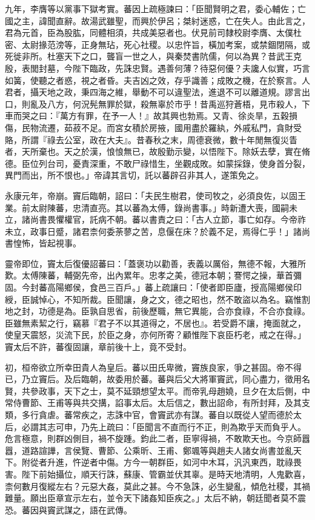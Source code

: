 \begin{pinyinscope}
九年，李膺等以黨事下獄考實。蕃因上疏極諫曰：「臣聞賢明之君，委心輔佐；亡國之主，諱聞直辭。故湯武雖聖，而興於伊呂；桀紂迷惑，亡在失人。由此言之，君為元首，臣為股肱，同體相須，共成美惡者也。伏見前司隸校尉李膺、太僕杜密、太尉掾范滂等，正身無玷，死心社稷。以忠忤旨，橫加考案，或禁錮閉隔，或死徙非所。杜塞天下之口，聾盲一世之人，與秦焚書阬儒，何以為異？昔武王克殷，表閭封墓，今陛下臨政，先誅忠賢。遇善何薄？待惡何優？夫讒人似實，巧言如簧，使聽之者惑，視之者昏。夫吉凶之效，存乎識善；成敗之機，在於察言。人君者，攝天地之政，秉四海之維，舉動不可以違聖法，進退不可以離道規。謬言出口，則亂及八方，何況髡無罪於獄，殺無辜於市乎！昔禹巡狩蒼梧，見市殺人，下車而哭之曰：『萬方有罪，在予一人！』故其興也勃焉。又青、徐炎旱，五穀損傷，民物流遷，茹菽不足。而宮女積於房掖，國用盡於羅紈，外戚私門，貪財受賂，所謂『祿去公室，政在大夫』。昔春秋之末，周德衰微，數十年閒無復災眚者，天所棄也。天之於漢，悢悢無已，故殷勤示變，以悟陛下。除妖去孽，實在脩德。臣位列台司，憂責深重，不敢尸祿惜生，坐觀成敗。如蒙採錄，使身首分裂，異門而出，所不恨也。」帝諱其言切，託以蕃辟召非其人，遂策免之。

永康元年，帝崩。竇后臨朝，詔曰：「夫民生樹君，使司牧之，必須良佐，以固王業。前太尉陳蕃，忠清直亮。其以蕃為太傅，錄尚書事。」時新遭大喪，國嗣未立，諸尚書畏懼權官，託病不朝。蕃以書責之曰：「古人立節，事亡如存。今帝祚未立，政事日蹙，諸君柰何委荼蓼之苦，息偃在床？於義不足，焉得仁乎！」諸尚書惶怖，皆起視事。

靈帝即位，竇太后復優詔蕃曰：「蓋褒功以勸善，表義以厲俗，無德不報，大雅所歎。太傅陳蕃，輔弼先帝，出內累年。忠孝之美，德冠本朝；謇愕之操，華首彌固。今封蕃高陽鄉侯，食邑三百戶。」蕃上疏讓曰：「使者即臣廬，授高陽鄉侯印綬，臣誠悼心，不知所裁。臣聞讓，身之文，德之昭也，然不敢盜以為名。竊惟割地之封，功德是為。臣孰自思省，前後歷職，無它異能，合亦食祿，不合亦食祿。臣雖無素絜之行，竊慕『君子不以其道得之，不居也』。若受爵不讓，掩面就之，使皇天震怒，災流下民，於臣之身，亦何所寄？顧惟陛下哀臣朽老，戒之在得。」竇太后不許，蕃復固讓，章前後十上，竟不受封。

初，桓帝欲立所幸田貴人為皇后。蕃以田氏卑微，竇族良家，爭之甚固。帝不得已，乃立竇后。及后臨朝，故委用於蕃。蕃與后父大將軍竇武，同心盡力，徵用名賢，共參政事，天下之士，莫不延頸想望太平。而帝乳母趙嬈，旦夕在太后側，中常侍曹節、王甫等與共交搆，諂事太后。太后信之，數出詔命，有所封拜，及其支類，多行貪虐。蕃常疾之，志誅中官，會竇武亦有謀。蕃自以既從人望而德於太后，必謂其志可申，乃先上疏曰：「臣聞言不直而行不正，則為欺乎天而負乎人。危言極意，則群凶側目，禍不旋踵。鈞此二者，臣寧得禍，不敢欺天也。今京師囂囂，道路諠譁，言侯覽、曹節、公乘昕、王甫、鄭颯等與趙夫人諸女尚書並亂天下。附從者升進，忤逆者中傷。方今一朝群臣，如河中木耳，汎汎東西，耽祿畏害。陛下前始攝位，順天行誅，蘇康、管霸並伏其辜。是時天地清明，人鬼歡喜，柰何數月復縱左右？元惡大姦，莫此之甚。今不急誅，必生變亂，傾危社稷，其禍難量。願出臣章宣示左右，並令天下諸姦知臣疾之。」太后不納，朝廷聞者莫不震恐。蕃因與竇武謀之，語在武傳。


\end{pinyinscope}
